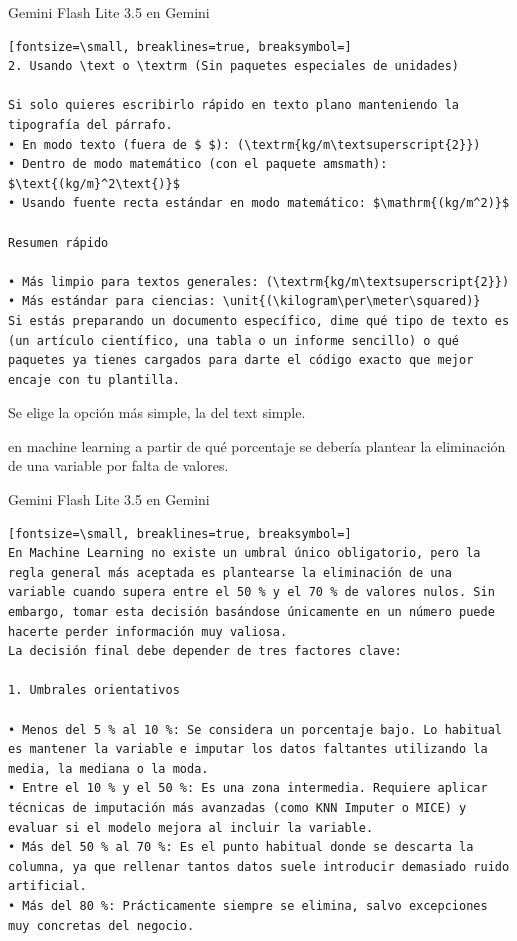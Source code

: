 \documentclass[12pt,a4paper,oneside]{book}
\begin{document}
\begin{iaprompt}
\begin{iaresp}{Gemini Flash Lite 3.5 en Gemini}
\begin{Verbatim}[fontsize=\small, breaklines=true, breaksymbol=]
2. Usando \text o \textrm (Sin paquetes especiales de unidades)

Si solo quieres escribirlo rápido en texto plano manteniendo la tipografía del párrafo.
• En modo texto (fuera de $ $): (\textrm{kg/m\textsuperscript{2}})
• Dentro de modo matemático (con el paquete amsmath): $\text{(kg/m}^2\text{)}$
• Usando fuente recta estándar en modo matemático: $\mathrm{(kg/m^2)}$

Resumen rápido

• Más limpio para textos generales: (\textrm{kg/m\textsuperscript{2}})
• Más estándar para ciencias: \unit{(\kilogram\per\meter\squared)}
Si estás preparando un documento específico, dime qué tipo de texto es (un artículo científico, una tabla o un informe sencillo) o qué paquetes ya tienes cargados para darte el código exacto que mejor encaje con tu plantilla.

\end{Verbatim}
\end{iaresp}
\begin{iaanalisis}
Se elige la opción más simple, la del text simple.
\end{iaanalisis}



\begin{iaprompt}
en machine learning a partir de qué porcentaje se debería plantear la eliminación de una variable por falta de valores.
\end{iaprompt}
\begin{iaresp}{Gemini Flash Lite 3.5 en Gemini}
\begin{Verbatim}[fontsize=\small, breaklines=true, breaksymbol=]
En Machine Learning no existe un umbral único obligatorio, pero la regla general más aceptada es plantearse la eliminación de una variable cuando supera entre el 50 % y el 70 % de valores nulos. Sin embargo, tomar esta decisión basándose únicamente en un número puede hacerte perder información muy valiosa.
La decisión final debe depender de tres factores clave:

1. Umbrales orientativos

• Menos del 5 % al 10 %: Se considera un porcentaje bajo. Lo habitual es mantener la variable e imputar los datos faltantes utilizando la media, la mediana o la moda.
• Entre el 10 % y el 50 %: Es una zona intermedia. Requiere aplicar técnicas de imputación más avanzadas (como KNN Imputer o MICE) y evaluar si el modelo mejora al incluir la variable.
• Más del 50 % al 70 %: Es el punto habitual donde se descarta la columna, ya que rellenar tantos datos suele introducir demasiado ruido artificial.
• Más del 80 %: Prácticamente siempre se elimina, salvo excepciones muy concretas del negocio.


\end{Verbatim}
\end{iaresp}
\end{iaprompt}
\end{document}
